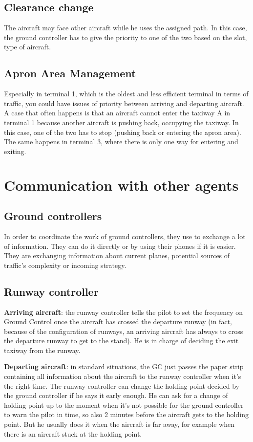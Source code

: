 \documentclass{article}
\begin{document}
\subsection{Clearance change}
The aircraft may face other aircraft while he uses the assigned path. In this case, the ground controller has to give the priority to one of the two based on the slot, type of aircraft.

\subsection{Apron Area Management}
Especially in terminal 1, which is the oldest and less efficient terminal in terms of traffic, you could have issues of priority between arriving and departing aircraft. A case that often happens is that an aircraft cannot enter the taxiway A in terminal 1 because another aircraft is pushing back, occupying the taxiway. In this case, one of the two has to stop (pushing back or entering the apron area). The same happens in terminal 3, where there is only one way for entering and exiting. 

\section{Communication with other agents}
\subsection{Ground controllers}
In order to coordinate the work of ground controllers, they use to exchange a lot of information. They can do it directly or by using their phones if it is easier. They are exchanging information about current planes, potential sources of traffic's complexity or incoming strategy.

\subsection{Runway controller}
\textbf{Arriving aircraft}: the runway controller tells the pilot to set the frequency on Ground Control once the aircraft has crossed the departure runway (in fact, because of the configuration of runways, an arriving aircraft has always to cross the departure runway to get to the stand). 
He is in charge of deciding the exit taxiway from the runway.

\textbf{Departing aircraft}: in standard situations, the GC just passes the paper strip containing all information about the aircraft to the runway controller when it's the right time.
The runway controller can change the holding point decided by the ground controller if he says it early enough. He can ask for a change of holding point up to the moment when it's not possible for the ground controller to warn the pilot in time, so also 2 minutes before the aircraft gets to the holding point. But he usually does it when the aircraft is far away, for example when there is an aircraft stuck at the holding point.
\end{document}
